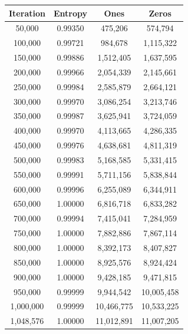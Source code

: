 \documentclass[letterpaper]{article}
\begin{document}
\begin{multicols}{2}
    \noindent
    \begin{minipage}{\columnwidth}
        \setlength{\tabcolsep}{.35\tabcolsep}
        \centering
        \begin{tabular}{|c|c|c|c|}
            \hline
            \textbf{Iteration} & \textbf{Entropy} & \textbf{Ones} & \textbf{Zeros} \\
            \hline
            50,000             & 0.99350          & 475,206       & 574,794        \\
            100,000            & 0.99721          & 984,678       & 1,115,322      \\
            150,000            & 0.99886          & 1,512,405     & 1,637,595      \\
            200,000            & 0.99966          & 2,054,339     & 2,145,661      \\
            250,000            & 0.99984          & 2,585,879     & 2,664,121      \\
            300,000            & 0.99970          & 3,086,254     & 3,213,746      \\
            350,000            & 0.99987          & 3,625,941     & 3,724,059      \\
            400,000            & 0.99970          & 4,113,665     & 4,286,335      \\
            450,000            & 0.99976          & 4,638,681     & 4,811,319      \\
            500,000            & 0.99983          & 5,168,585     & 5,331,415      \\
            550,000            & 0.99991          & 5,711,156     & 5,838,844      \\
            600,000            & 0.99996          & 6,255,089     & 6,344,911      \\
            650,000            & 1.00000          & 6,816,718     & 6,833,282      \\
            700,000            & 0.99994          & 7,415,041     & 7,284,959      \\
            750,000            & 1.00000          & 7,882,886     & 7,867,114      \\
            800,000            & 1.00000          & 8,392,173     & 8,407,827      \\
            850,000            & 1.00000          & 8,925,576     & 8,924,424      \\
            900,000            & 1.00000          & 9,428,185     & 9,471,815      \\
            950,000            & 0.99999          & 9,944,542     & 10,005,458     \\
            1,000,000          & 0.99999          & 10,466,775    & 10,533,225     \\
            1,048,576          & 1.00000          & 11,012,891    & 11,007,205     \\
            \hline
        \end{tabular}
    \end{minipage}


\end{multicols}
\end{document}
